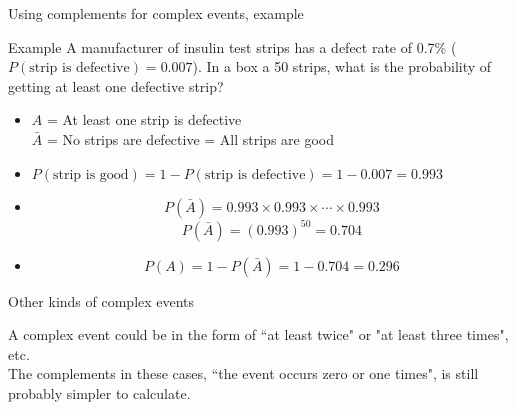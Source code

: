 \documentclass[xcolor=table, handout]{beamer}
\begin{document}
\begin{frame}{Using complements for complex events, example}
\begin{exampleblock}{Example}
A manufacturer of insulin test strips has a defect rate of 0.7\% ($P(\text{strip is defective}) = 0.007$). In a box a 50 strips, what is the probability of getting at least one defective strip?
\begin{itemize}
\pause
\item $A$ = At least one strip is defective\\
$\bar A$ = No strips are defective = All strips are good
\pause
\item $P(\text{strip is good}) = 1 - P(\text{strip is defective}) = 1 - 0.007 = 0.993$ 
\pause
\item \[P(\bar A) = 0.993 \times 0.993 \times \cdots \times 0.993\]
\[P(\bar A) = (0.993)^{50} = 0.704\]
\vspace*{-\baselineskip}\pause 
\item \[P(A) = 1 - P(\bar A) = 1 - 0.704 = 0.296\]
\end{itemize}
\end{exampleblock}
\end{frame}

\begin{frame}{Other kinds of complex events}
\begin{block}{}
A complex event could be in the form of ``at least twice" or "at least three times", etc.\\
\medskip
\pause
The complements in these cases, ``the event occurs zero or one times", is still probably simpler to calculate.
\end{block}
\end{frame}
\end{document}

